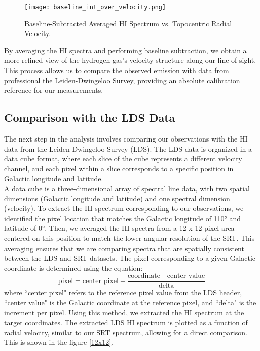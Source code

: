 \documentclass[linenumbers,twocolumn]{aastex631}
\begin{document}
\begin{figure}[h]
    \centering
    \texttt{[image: baseline\_int\_over\_velocity.png]}
    \caption{Baseline-Subtracted Averaged HI Spectrum vs. Topocentric Radial Velocity.}
    \label{fig:baseline_subtracted}
\end{figure}

By averaging the HI spectra and performing baseline subtraction, we obtain a more refined view of the hydrogen gas's velocity structure along our line of sight. This process allows us to compare the observed emission with data from professional the Leiden-Dwingeloo Survey, providing an absolute calibration reference for our measurements.

\subsection{Comparison with the LDS Data}

The next step in the analysis involves comparing our observations with the HI data from the Leiden-Dwingeloo Survey (LDS). The LDS data is organized in a data cube format, where each slice of the cube represents a different velocity channel, and each pixel within a slice corresponds to a specific position in Galactic longitude and latitude. \\

A data cube is a three-dimensional array of spectral line data, with two spatial dimensions (Galactic longitude and latitude) and one spectral dimension (velocity). To extract the HI spectrum corresponding to our observations, we identified the pixel location that matches the Galactic longitude of 110° and latitude of 0°. Then, we averaged the HI spectra from a 12 x 12 pixel area centered on this position to match the lower angular resolution of the SRT. This averaging ensures that we are comparing spectra that are spatially consistent between the LDS and SRT datasets. The pixel corresponding to a given Galactic coordinate is determined using the equation:
\[
\text{pixel} = \text{center pixel} + \frac{\text{coordinate - center value}}{\text{delta}}
\]
where ``center pixel" refers to the reference pixel value from the LDS header, ``center value" is the Galactic coordinate at the reference pixel, and ``delta" is the increment per pixel. Using this method, we extracted the HI spectrum at the target coordinates. The extracted LDS HI spectrum is plotted as a function of radial velocity, similar to our SRT spectrum, allowing for a direct comparison. This is shown in the figure \ref{12x12}.
\end{document}

